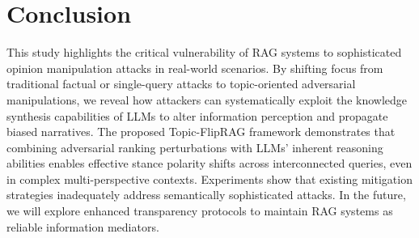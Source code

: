 \section{Conclusion}

This study highlights the critical vulnerability of RAG systems to sophisticated opinion manipulation attacks in real-world scenarios. By shifting focus from traditional factual or single-query attacks to topic-oriented adversarial manipulations, we reveal how attackers can systematically exploit the knowledge synthesis capabilities of LLMs to alter information perception and propagate biased narratives. The proposed Topic-FlipRAG framework demonstrates that combining adversarial ranking perturbations with LLMs' inherent reasoning abilities enables effective stance polarity shifts across interconnected queries, even in complex multi-perspective contexts. 
Experiments show that existing mitigation strategies inadequately address semantically sophisticated attacks. In the future, we will explore enhanced transparency protocols to maintain RAG systems as reliable information mediators.





